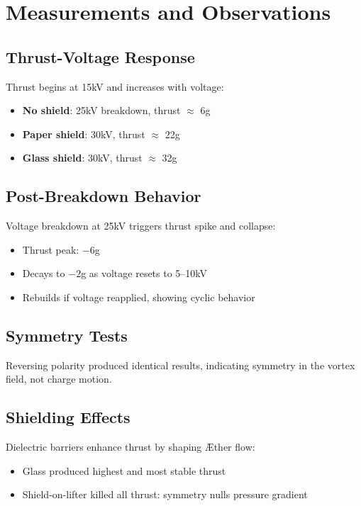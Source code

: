 \documentclass[a4paper,12pt]{article}
\begin{document}

\section{Measurements and Observations}
\subsection{Thrust-Voltage Response}
Thrust begins at 15kV and increases with voltage:
\begin{itemize}
    \item \textbf{No shield}: 25kV breakdown, thrust $\approx$ 6g
    \item \textbf{Paper shield}: 30kV, thrust $\approx$ 22g
    \item \textbf{Glass shield}: 30kV, thrust $\approx$ 32g
\end{itemize}


\subsection{Post-Breakdown Behavior}
Voltage breakdown at 25kV triggers thrust spike and collapse:
\begin{itemize}
    \item Thrust peak: $-6$g
    \item Decays to $-2$g as voltage resets to 5--10kV
    \item Rebuilds if voltage reapplied, showing cyclic behavior
\end{itemize}

\subsection{Symmetry Tests}
Reversing polarity produced identical results, indicating symmetry in the vortex field, not charge motion.

\subsection{Shielding Effects}
Dielectric barriers enhance thrust by shaping Æther flow:
\begin{itemize}
    \item Glass produced highest and most stable thrust
    \item Shield-on-lifter killed all thrust: symmetry nulls pressure gradient
\end{itemize}
\end{document}
